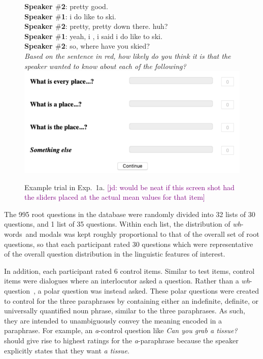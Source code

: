 \documentclass[12pt,letterpaper,table,svgnames,dvipsnames]{article}
\newcommand{\jd}[1]{\textcolor{Purple}{[jd: #1]}}
\newcommand{\whq}{\emph{wh}-question~}
\newcommand{\whws}{\emph{wh}-words~}
\begin{document}
\begin{figure}%
\begin{tcolorbox}[colback=white]
\textbf{Speaker $\#$2}: pretty good.\\
\textbf{Speaker $\#$1}: i do like to ski.\\
\textbf{Speaker $\#$2}: pretty, pretty down there. huh?\\
\textbf{Speaker $\#$1}: yeah, i , i said i do like to ski.\\
\textbf{Speaker $\#$2}: \color{red}so, where have you skied?\color{black}\\

\noindent \emph{Based on the sentence in red, how likely do you think it is that the speaker wanted to know about each of the following?}\\

\includegraphics[scale=.52]{figures/sliders_rq.png}
\end{tcolorbox}
\caption{Example trial in Exp.~1a. \jd{would be neat if this screen shot had the sliders placed at the actual mean values for that item}} %
\label{trial-ex1a}
\end{figure}

The 995 root questions in the database were randomly divided into 32 lists of 30 questions, and 1 list of 35 questions. Within each list, the distribution of \whws and modals was kept roughly proportional to that of the overall set of root questions, so that each participant rated 30 questions which were representative of the overall question distribution in the linguistic features of interest. %

In addition, each participant rated 6 control items. Similar to test items, control items were dialogues where an interlocutor asked a question. Rather than a \whq, a polar question was instead asked. These polar questions were created to control for the three paraphrases by containing either an indefinite, definite, or universally quantified noun phrase, similar to the three paraphrases. As such, they are intended to unambiguously convey the meaning encoded in a paraphrase. For example, an \emph{a}-control question like \emph{Can you grab a tissue?} should give rise to highest ratings for the \emph{a}-paraphrase because the speaker explicitly states that they want \emph{a tissue}.
    
\end{document}
